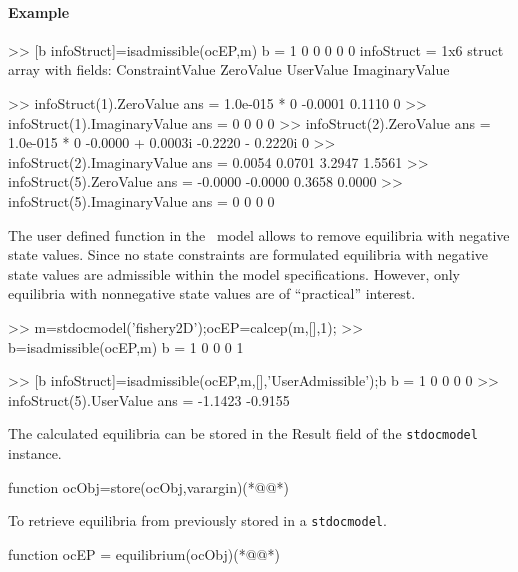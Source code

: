 \paragraph{Example}
\begin{matlab}
>> [b infoStruct]=isadmissible(ocEP,m)
b =
     1     0     0     0     0     0
infoStruct = 
1x6 struct array with fields:
    ConstraintValue
    ZeroValue
    UserValue
    ImaginaryValue
		
>> infoStruct(1).ZeroValue
ans =
  1.0e-015 *
         0
   -0.0001
    0.1110
         0
>> infoStruct(1).ImaginaryValue
ans =
     0
     0
     0
     0
>> infoStruct(2).ZeroValue
ans =
  1.0e-015 *
        0          
  -0.0000 + 0.0003i
  -0.2220 - 0.2220i
        0          
>> infoStruct(2).ImaginaryValue
ans =
    0.0054
    0.0701
    3.2947
    1.5561
>> infoStruct(5).ZeroValue
ans =
   -0.0000
   -0.0000
    0.3658
    0.0000
>> infoStruct(5).ImaginaryValue
ans =
     0
     0
     0
     0
\end{matlab}
The user defined function in the \FM\ model allows to remove equilibria with negative state values. Since no state constraints are formulated equilibria with negative state values are admissible within the model specifications. However, only equilibria with nonnegative state values are of ``practical'' interest.
\begin{matlab}
>> m=stdocmodel('fishery2D');ocEP=calcep(m,[],1);
>> b=isadmissible(ocEP,m)
b =
     1     0     0     0     1
		
>> [b infoStruct]=isadmissible(ocEP,m,[],'UserAdmissible');b
b =
     1     0     0     0     0
>> infoStruct(5).UserValue
ans =
   -1.1423
   -0.9155
\end{matlab}
The calculated equilibria can be stored in the Result field of the \lstinline+stdocmodel+ instance.
\begin{matlab}
function ocObj=store(ocObj,varargin)(*@\label{cmd:store}@*)
%
%
\end{matlab}
To retrieve equilibria from previously stored in a \lstinline+stdocmodel+.
\begin{matlab}
function ocEP = equilibrium(ocObj)(*@@*)
%
%
\end{matlab}
